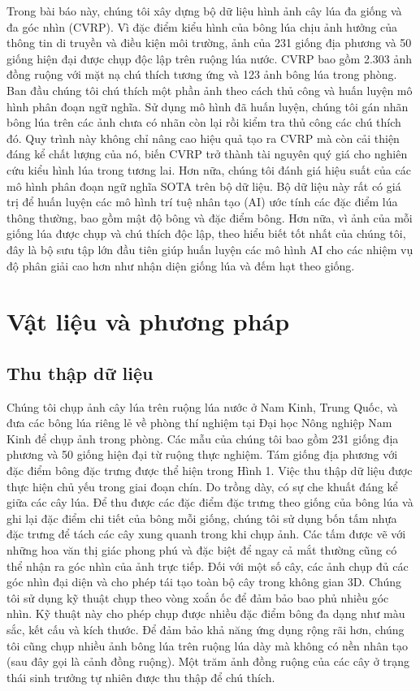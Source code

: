 \documentclass[12pt, a4paper]{article}
\begin{document}
Trong bài báo này, chúng tôi xây dựng bộ dữ liệu hình ảnh cây lúa đa giống và đa góc nhìn
(CVRP). Vì đặc điểm kiểu hình của bông lúa chịu ảnh hưởng của thông tin di truyền và điều
kiện môi trường, ảnh của 231 giống địa phương và 50 giống hiện đại được chụp độc lập trên
ruộng lúa nước. CVRP bao gồm 2.303 ảnh đồng ruộng với mặt nạ chú thích tương ứng và 123
ảnh bông lúa trong phòng. Ban đầu chúng tôi chú thích một phần ảnh theo cách thủ công và
huấn luyện mô hình phân đoạn ngữ nghĩa. Sử dụng mô hình đã huấn luyện, chúng tôi gán nhãn
bông lúa trên các ảnh chưa có nhãn còn lại rồi kiểm tra thủ công các chú thích đó. Quy
trình này không chỉ nâng cao hiệu quả tạo ra CVRP mà còn cải thiện đáng kể chất lượng của
nó, biến CVRP trở thành tài nguyên quý giá cho nghiên cứu kiểu hình lúa trong tương lai.
Hơn nữa, chúng tôi đánh giá hiệu suất của các mô hình phân đoạn ngữ nghĩa SOTA trên bộ dữ
liệu. Bộ dữ liệu này rất có giá trị để huấn luyện các mô hình trí tuệ nhân tạo (AI) ước
tính các đặc điểm lúa thông thường, bao gồm mật độ bông và đặc điểm bông. Hơn nữa, vì ảnh
của mỗi giống lúa được chụp và chú thích độc lập, theo hiểu biết tốt nhất của chúng tôi, đây
là bộ sưu tập lớn đầu tiên giúp huấn luyện các mô hình AI cho các nhiệm vụ độ phân giải cao
hơn như nhận diện giống lúa và đếm hạt theo giống.

\section{Vật liệu và phương pháp}

\subsection{Thu thập dữ liệu}

Chúng tôi chụp ảnh cây lúa trên ruộng lúa nước ở Nam Kinh, Trung Quốc, và đưa các bông lúa
riêng lẻ về phòng thí nghiệm tại Đại học Nông nghiệp Nam Kinh để chụp ảnh trong phòng. Các
mẫu của chúng tôi bao gồm 231 giống địa phương và 50 giống hiện đại từ ruộng thực nghiệm.
Tám giống địa phương với đặc điểm bông đặc trưng được thể hiện trong Hình 1. Việc thu thập
dữ liệu được thực hiện chủ yếu trong giai đoạn chín. Do trồng dày, có sự che khuất đáng kể
giữa các cây lúa. Để thu được các đặc điểm đặc trưng theo giống của bông lúa và ghi lại đặc
điểm chi tiết của bông mỗi giống, chúng tôi sử dụng bốn tấm nhựa đặc trưng để tách các cây
xung quanh trong khi chụp ảnh. Các tấm được vẽ với những hoa văn thị giác phong phú và đặc
biệt để ngay cả mắt thường cũng có thể nhận ra góc nhìn của ảnh trực tiếp. Đối với một số
cây, các ảnh chụp đủ các góc nhìn đại diện và cho phép tái tạo toàn bộ cây trong không gian
3D. Chúng tôi sử dụng kỹ thuật chụp theo vòng xoắn ốc để đảm bảo bao phủ nhiều góc nhìn.
Kỹ thuật này cho phép chụp được nhiều đặc điểm bông đa dạng như màu sắc, kết cấu và kích
thước. Để đảm bảo khả năng ứng dụng rộng rãi hơn, chúng tôi cũng chụp nhiều ảnh bông lúa
trên ruộng lúa dày mà không có nền nhân tạo (sau đây gọi là cảnh đồng ruộng). Một trăm ảnh
đồng ruộng của các cây ở trạng thái sinh trưởng tự nhiên được thu thập để chú thích.
\end{document}
